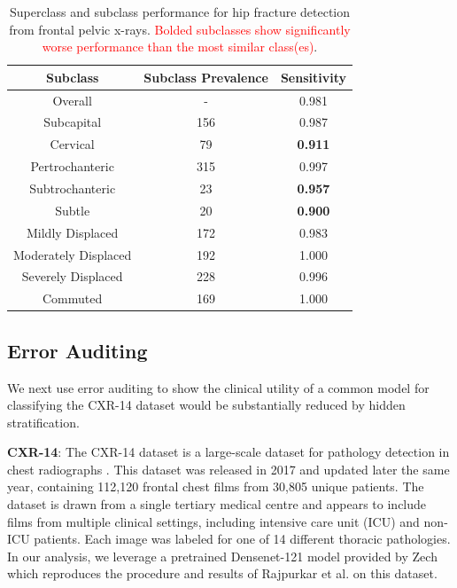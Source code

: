 \documentclass{article}
\begin{document}
\begin{table}[htb!]
\centering
\begin{tabular}{|c|c|c|}
\hline
 Subclass & Subclass Prevalence & Sensitivity \\
 \hline
 Overall & - & 0.981  \\
 Subcapital & 156 & 0.987   \\
 Cervical & 79 & \textbf{0.911}\\
 Pertrochanteric & 315  & 0.997\\
 Subtrochanteric & 23 & \textbf{0.957} \\
 Subtle & 20 & \textbf{0.900}\\
 Mildly Displaced & 172 & 0.983\\
 Moderately Displaced & 192 & 1.000\\
 Severely Displaced & 228 & 0.996\\
 Commuted & 169 & 1.000 \\ 
 \hline
\end{tabular}
\caption{Superclass and subclass performance for hip fracture detection from frontal pelvic x-rays. \textcolor{red}{Bolded subclasses show significantly worse performance than the most similar class(es)}.}
\label{tab:hip1}
\vspace{-6mm}
\end{table}

\subsection{Error Auditing}

We next use error auditing to show the clinical utility of a common model for classifying the CXR-14 dataset would be substantially reduced by hidden stratification.

\textbf{CXR-14}: The CXR-14 dataset is a large-scale dataset for pathology detection in chest radiographs \citep{Wang2017-vm}. 
This dataset was released in 2017 and updated later the same year, containing 112,120 frontal chest films from 30,805 unique patients. 
The dataset is drawn from a single tertiary medical centre and appears to include films from multiple clinical settings, including intensive care unit (ICU) and non-ICU patients.  
Each image was labeled for one of 14 different thoracic pathologies.  
In our analysis, we leverage a pretrained Densenet-121 model provided by Zech \citep{Zech_undated-cw} which reproduces the procedure and results of Rajpurkar et al. \citep{Rajpurkar2018-gc} on this dataset.  
\end{document}
